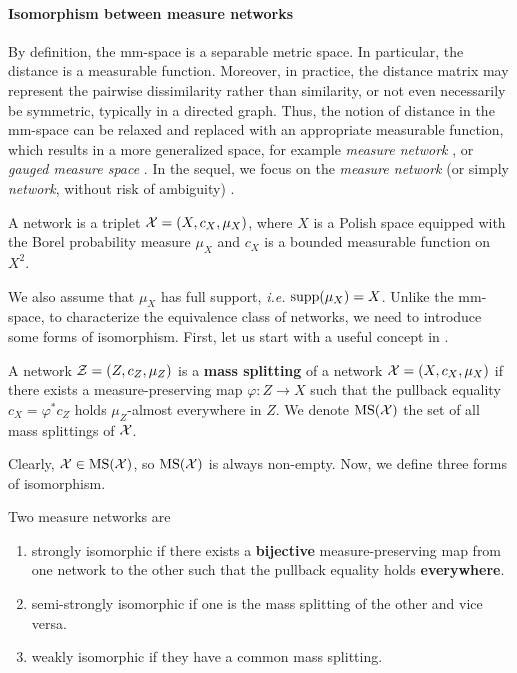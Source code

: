 \paragraph{Isomorphism between measure networks}
By definition, the mm-space is a separable metric space. In particular, the distance is
a measurable function. Moreover, in practice, the distance matrix may represent the
pairwise dissimilarity rather than similarity, or not even necessarily be symmetric,
typically in a directed graph.
Thus, the notion of distance in the mm-space can be relaxed and replaced
with an appropriate measurable function, which results in a more generalized space, for example
\textit{measure network} \citep{Chowdhury19}, or \textit{gauged measure space} \citep{Sturm12}.
In the sequel, we focus on the \textit{measure network} (or simply \textit{network},
without risk of ambiguity) \citep{Chowdhury19}.
\begin{definition}
  A network is a triplet $\mathcal X = (X, c_X, \mu_X)$,
  where $X$ is a Polish space equipped with the Borel probability
  measure $\mu_X$ and $c_X$ is a bounded measurable function on $X^2$.
\end{definition}
We also assume that $\mu_X$ has full support, \textit{i.e.} $\text{supp}(\mu_X) = X$.
Unlike the mm-space, to characterize the equivalence class of networks, we need to introduce
some forms of isomorphism. First, let us start with a useful concept in \citep{Memoli21}.
\begin{definition}
  A network $\mathcal Z = (Z, c_Z, \mu_Z)$ is a \textbf{mass splitting}
  of a network $\mathcal X = (X, c_X, \mu_X)$ if there exists
  a measure-preserving map $\varphi: Z \to X$ such that the pullback equality
  $c_X = \varphi^*c_Z$ holds $\mu_Z$-almost everywhere in $Z$.
  We denote $\text{MS}(\mathcal X)$ the set of all mass splittings of $\mathcal X$.
\end{definition}
Clearly, $\mathcal X \in \text{MS}(\mathcal X)$, so $\text{MS}(\mathcal X)$ is always non-empty. Now, we define three forms of
isomorphism.
\begin{definition}[Isomorphism] \label{def:isomorphic}
  Two measure networks are
  \begin{enumerate}
    \item strongly isomorphic if there exists a \textbf{bijective}
    measure-preserving map from one network to the other such that the pullback equality holds
    \textbf{everywhere}.
    \item semi-strongly isomorphic if one is the mass splitting of the other and vice versa.
    \item weakly isomorphic if they have a common mass splitting.
  \end{enumerate}
\end{definition}
